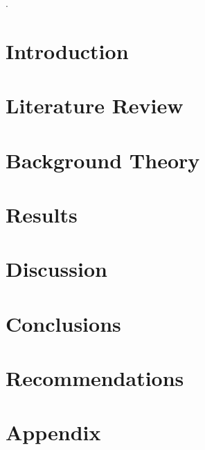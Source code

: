 \documentclass[12pt]{report}
\begin{document}




\newpage

\newpage


\tableofcontents.
\listoffigures

\chapter{Introduction}


\chapter{Literature Review}


\chapter{Background Theory} \label{backTheory}


\chapter{Results}


\chapter{Discussion}


\chapter{Conclusions}


\chapter{Recommendations}


\appendix
\chapter{Appendix}


\printbibliography
\end{document}
